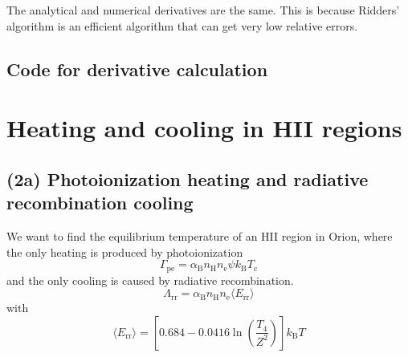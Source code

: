 \documentclass{article}
\newcommand{\CodeDir}{Code}
\begin{document}
The analytical and numerical derivatives are the same. This is because Ridders' algorithm is an efficient algorithm that can get very low relative errors.

\subsection{Code for derivative calculation}



\section{Heating and cooling in HII regions}


\subsection{(2a) Photoionization heating and radiative recombination cooling}

We want to find the equilibrium temperature of an HII region in Orion, where the only heating is produced by photoionization 
\begin{equation}
    \Gamma_\mathrm{pe} = \alpha_\mathrm{B}n_\mathrm{H}n_\mathrm{e}\psi k_\mathrm{B}T_\mathrm{c}
\end{equation}
and the only cooling is caused by radiative recombination.
\begin{equation}
    \Lambda_\mathrm{rr} = \alpha_\mathrm{B}n_\mathrm{H}n_\mathrm{e}\langle E_\mathrm{rr}\rangle
\end{equation}
with
\begin{equation}
    \langle E_\mathrm{rr}\rangle = \left[0.684 - 0.0416\ln\left(\frac{T_4}{Z^2}\right)\right]k_\mathrm{B}T
\end{equation}
\end{document}
